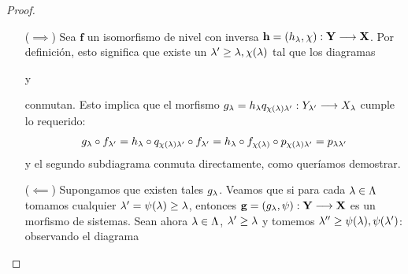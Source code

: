 \begin{proof}
  \begin{itemize}
    \item[]
    \item[($ \implies  $)] Sea $ \mathbf{f } $ un isomorfismo de nivel con inversa $ \mathbf{h } = (h_\lambda ,\chi ):\mathbf{Y }\longrightarrow \mathbf{X} $. Por definición, esto significa que existe un $ \lambda'\geq \lambda,\chi(\lambda ) $ tal que los diagramas
    \begin{center}
         y 
    \end{center}
    conmutan. Esto implica que el morfismo $ g_\lambda = h_\lambda q_{\chi(\lambda)\lambda'}:Y_{\lambda' }\longrightarrow X_{\lambda}  $ cumple lo requerido: 
    \begin{gather*}
      g_\lambda \circ f_{\lambda'} = h_\lambda\circ  q_{\chi(\lambda)\lambda'} \circ f_{\lambda'} = h_{\lambda} \circ f_{\chi(\lambda)} \circ p_{\chi(\lambda)\lambda'} = p_{\lambda\lambda'}
    \end{gather*}
    y el segundo subdiagrama conmuta directamente, como queríamos demostrar.
    \item[($ \impliedby  $)] Supongamos que existen tales $ g_\lambda $. Veamos que si para cada $ \lambda\in \Lambda  $ tomamos cualquier $  \lambda' =\psi(\lambda)  \geq \lambda  $, entonces $ \mathbf{g } = (g_\lambda,\psi ):\mathbf{Y}\longrightarrow \mathbf{X}  $ es un morfismo de sistemas. Sean ahora $ \lambda\in \Lambda  $, $ \lambda'\geq \lambda  $ y  tomemos $ \lambda''\geq \psi(\lambda),\psi(\lambda') $: observando el diagrama 
    \begin{center}
\end{center}
\end{itemize}
\end{proof}

